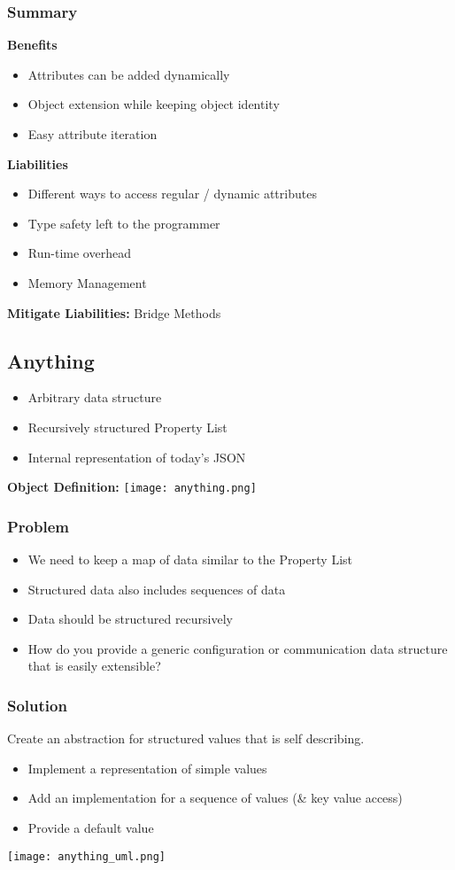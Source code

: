 \subsubsection{Summary}
\textbf{Benefits}
\begin{itemize}
    \item Attributes can be added dynamically
    \item Object extension while keeping object identity
    \item Easy attribute iteration
\end{itemize}
\textbf{Liabilities}
\begin{itemize}
    \item Different ways to access regular / dynamic attributes
    \item Type safety left to the programmer
    \item Run-time overhead
    \item Memory Management
\end{itemize}
\textbf{Mitigate Liabilities:} Bridge Methods

\subsection{Anything}
\begin{itemize}
    \item Arbitrary data structure
    \item Recursively structured Property List
    \item Internal representation of today's JSON
\end{itemize}
\textbf{Object Definition:}
\texttt{[image: anything.png]}
\subsubsection{Problem}
\begin{itemize}
    \item We need to keep a map of data similar to the Property List
    \item Structured data also includes sequences of data
    \item Data should be structured recursively
    \item How do you provide a generic configuration or communication data structure that is easily extensible?
\end{itemize}
\subsubsection{Solution}
Create an abstraction for structured values that is self describing.
\begin{itemize}
    \item Implement a representation of simple values
    \item Add an implementation for a sequence of values (\& key value access)
    \item Provide a default value
\end{itemize}
\texttt{[image: anything\_uml.png]}
